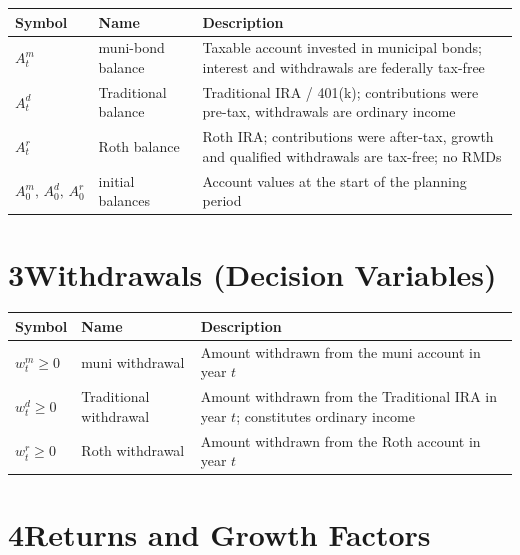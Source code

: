 \documentclass[12pt]{article}
\begin{document}
\medskip
\begin{tabular}{@{} L{2.6cm} L{4.4cm} L{6.5cm} @{}}
\toprule
\textbf{Symbol} & \textbf{Name} & \textbf{Description} \\
\midrule
$A^m_t$ & muni-bond balance & Taxable account invested in municipal bonds;
          interest and withdrawals are federally tax-free \\[3pt]
$A^d_t$ & Traditional balance & Traditional IRA / 401(k); contributions were
          pre-tax, withdrawals are ordinary income \\[3pt]
$A^r_t$ & Roth balance & Roth IRA; contributions were after-tax,
          growth and qualified withdrawals are tax-free; no RMDs \\[3pt]
$A^m_0,\,A^d_0,\,A^r_0$ & initial balances & Account values at the start of the planning period \\
\bottomrule
\end{tabular}

\section*{3\quad Withdrawals (Decision Variables)}

\begin{tabular}{@{} L{2.6cm} L{4.4cm} L{6.5cm} @{}}
\toprule
\textbf{Symbol} & \textbf{Name} & \textbf{Description} \\
\midrule
$w^m_t \geq 0$ & muni withdrawal & Amount withdrawn from the muni account in year $t$ \\[3pt]
$w^d_t \geq 0$ & Traditional withdrawal & Amount withdrawn from the Traditional IRA in year $t$;
                 constitutes ordinary income \\[3pt]
$w^r_t \geq 0$ & Roth withdrawal & Amount withdrawn from the Roth account in year $t$ \\
\bottomrule
\end{tabular}

\section*{4\quad Returns and Growth Factors}
\end{document}
